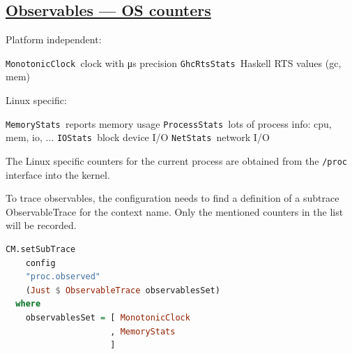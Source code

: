 \begin{mdframed}

    \section*{\href{https://github.com/input-output-hk/iohk-monitoring-framework/blob/master/iohk-monitoring/src/Cardano/BM/Data/Counter.lhs}{Observables --- OS counters}}

Platform independent:

\texttt{MonotonicClock }clock with μs precision\newline
\texttt{GhcRtsStats    }Haskell RTS values (gc, mem)

Linux specific:

\texttt{MemoryStats    }reports memory usage\newline
\texttt{ProcessStats   }lots of process info: cpu, mem, io, ...\newline
\texttt{IOStats        }block device I/O\newline
\texttt{NetStats       }network I/O

The Linux specific counters for the current process are obtained from the \texttt{/proc} interface into the kernel.

To trace observables, the configuration needs to find a definition of a subtrace ObservableTrace for the context name. Only the mentioned counters in the list will be recorded.

    \begin{lstlisting}[language=Haskell]
CM.setSubTrace
    config
    "proc.observed"
    (Just $ ObservableTrace observablesSet)
  where
    observablesSet = [ MonotonicClock
                     , MemoryStats
                     ]
    \end{lstlisting}

%
%
%
\end{mdframed}


